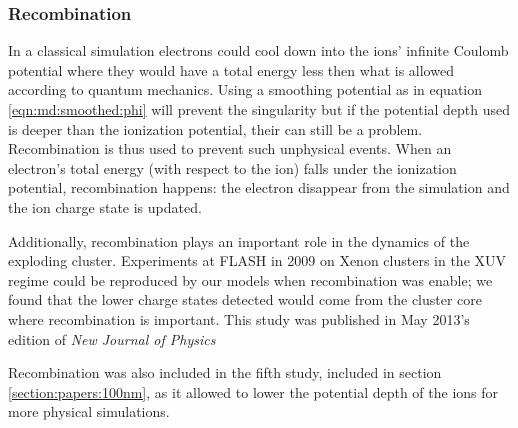 
\subsubsection{Recombination}

In a classical simulation electrons could cool down into the ions' infinite Coulomb
potential where they would have a total energy less then what is allowed
according to quantum mechanics. Using a smoothing potential as in equation
\eqref{eqn:md:smoothed:phi} will prevent the singularity but if the potential
depth used is deeper than the ionization potential, their can still be a problem.
Recombination is thus used to prevent such unphysical events. When an electron's
total energy (with respect to the ion) falls under the ionization potential,
recombination happens: the electron disappear from the simulation and the ion
charge state is updated.

Additionally, recombination plays an important role in the dynamics of the
exploding cluster. Experiments at FLASH in 2009 on Xenon clusters in the XUV
regime\cite{Thomas2009} could be reproduced by our models when recombination
was enable; we found that the lower charge states detected would come from the
cluster core where recombination is important. This study was published in
May 2013's edition of \textit{New Journal of Physics}\cite{Ackad2013}

Recombination was also included in the fifth study, included in section
\ref{section:papers:100nm}, as it allowed to lower the potential depth of the
ions for more physical simulations.


